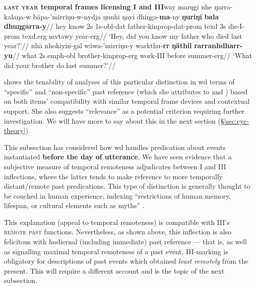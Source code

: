 \pex{}\textbf{\textsc{last year} temporal frames licensing \gls{I} and \gls{III}}\a\begingl\gla way marŋgi nhe ŋarra-kalaŋa-w bäpa-'mirriŋu-w-nydja ŋunhi ŋayi dhiŋga-\textbf{ma}-ny \textbf{ŋuriŋi} \textbf{bala} \textbf{dhuŋgarra-y}//
\glb hey know 2s 1s-\gls{obl}-\gls{dat} father-\gls{kinprop}-\gls{dat}-\gls{prom} \gls{texd} 3s die-\gls{I}-\gls{prom} \gls{texd}.\gls{erg} \gls{mvtawy} year-\gls{erg}//
\glft`Hey, did you know my father who died last year?'//\endgl
\a\begingl\gla nhä nhokiyin-gal wäwa-'mirriŋu-y warkthu-\textbf{rr} \textbf{ŋäthil} \textbf{rarranhdharr-yu}//
\glb what 2s.\gls{emph}-\gls{obl} brother-\gls{kinprop}-\gls{erg} work-\gls{III} before summer-\gls{erg}//
\glft`What did your brother do last summer?'//\endgl
\xe

\noindent \citeauthor{Wilkinson} shows the tenability of analyses of this particular distinction in \acrshort{wd} terms of ``specific'' and ``non-specific'' past reference (which she attributes to \citealp[178]{Waters1989} and \citealp{Lowe1996}) based on both items' compatibility with similar temporal frame devices and contextual support. She also suggests ``relevance'' as a potential criterion requiring further investigation. We will have more to say about this in the next section (\S\ref{sec:cyc-theory}).


This subsection has considered how \gls{wd} handles predication about events instantiated \textbf{before the day of utterance}. We have seen evidence that a subjective measure of temporal remoteness adjudicates between \gls{I} and \gls{III} inflections, where the latter tends to make reference to more temporally distant/remote past predications. This type of distinction is generally thought to be couched in human experience, indexing ``restrictions of human memory, lifespan, or cultural elements such as myths'' \citep[544]{Botne2012}.

This explanation (appeal to temporal remoteness) is compatible with \gls{III}'s \textsc{remote past} functions. Nevertheless, as shown above, this inflection is also felicitous with hodiernal (including immediate) past reference --- that is, as well as signalling maximal temporal remoteness of a past event, \gls{III}-marking is obligatory for descriptions of past events which obtained \textit{least remotely} from the present. This will require a different account and is the topic of the next subsection.

